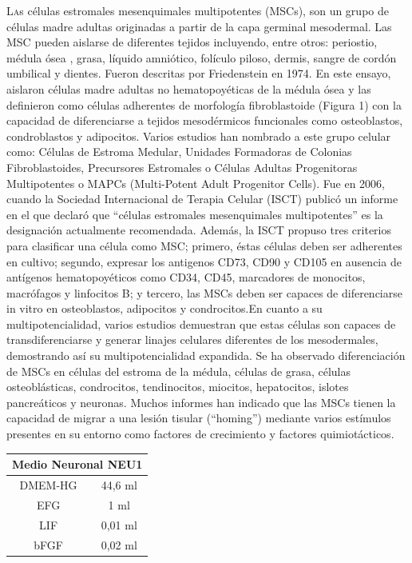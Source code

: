 \documentclass[a4paper,openright,12pt]{report}
\begin{document}
\lettrine{L}as células estromales mesenquimales multipotentes (MSCs), son un grupo de células madre adultas originadas a partir de la capa germinal mesodermal. Las MSC pueden aislarse de diferentes tejidos incluyendo, entre otros: periostio, médula ósea , grasa, líquido amniótico, folículo piloso, dermis, sangre de cordón umbilical y dientes. Fueron descritas por Friedenstein en 1974. En este ensayo, aislaron células madre adultas no hematopoyéticas de la médula ósea y las definieron como células adherentes de morfología fibroblastoide (Figura 1) con la capacidad de diferenciarse a tejidos mesodérmicos funcionales como osteoblastos, condroblastos y adipocitos. Varios estudios han nombrado a este grupo celular como: Células de Estroma Medular, Unidades Formadoras de Colonias Fibroblastoides, Precursores Estromales o Células Adultas Progenitoras Multipotentes o MAPCs (Multi-Potent Adult Progenitor Cells). Fue en 2006, cuando la Sociedad Internacional de Terapia Celular (ISCT) publicó un informe en el que declaró que “células estromales mesenquimales multipotentes” es la designación actualmente recomendada. Además, la ISCT propuso tres criterios para clasificar una célula como MSC; primero, éstas células deben ser adherentes en cultivo; segundo, expresar los  antigenos CD73, CD90 y CD105 en ausencia de antígenos hematopoyéticos como CD34, CD45, marcadores de monocitos, macrófagos y linfocitos B; y tercero, las MSCs deben ser capaces de diferenciarse in vitro en osteoblastos, adipocitos y condrocitos.En cuanto a su multipotencialidad, varios estudios demuestran que estas células son capaces de transdiferenciarse y generar linajes celulares diferentes de los mesodermales, demostrando así su multipotencialidad expandida. Se ha observado diferenciación de MSCs en células del estroma de la médula, células de grasa, células osteoblásticas, condrocitos, tendinocitos, miocitos, hepatocitos, islotes pancreáticos y neuronas.
Muchos informes han indicado que las MSCs tienen la capacidad de migrar a una lesión tisular (“homing”) mediante varios estímulos presentes en su entorno como factores de crecimiento y factores quimiotácticos. 

\newpage
\begin{tabular}{|c|c|}
\hline 
\multicolumn{2}{|c|}{Medio Neuronal NEU1} \\ 
\hline 
DMEM-HG & 44,6 ml \\ 
\hline 
EFG & 1 ml \\ 
\hline 
LIF & 0,01 ml \\ 
\hline 
bFGF & 0,02 ml \\ 
\hline 
\end{tabular} 
\end{document}
